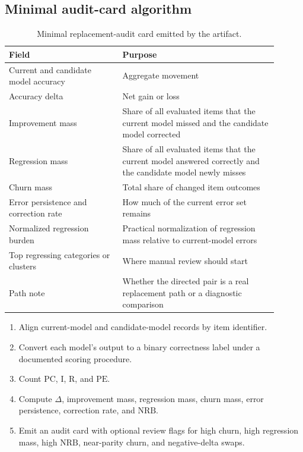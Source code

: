 \documentclass[manuscript, screen, review, nonacm]{jair}
\newcommand{\pc}{\mathrm{PC}}
\newcommand{\pe}{\mathrm{PE}}
\newcommand{\imp}{\mathrm{I}}
\newcommand{\reg}{\mathrm{R}}
\newcommand{\nrb}{\mathrm{NRB}}
\begin{document}
\subsection{Minimal audit-card algorithm}

\begin{table}[t]
\centering
\small
\begin{tabular}{p{0.38\linewidth}p{0.52\linewidth}}
\toprule
Field & Purpose \\
\midrule
Current and candidate model accuracy & Aggregate movement \\
Accuracy delta & Net gain or loss \\
Improvement mass & Share of all evaluated items that the current model missed and the candidate model corrected \\
Regression mass & Share of all evaluated items that the current model answered correctly and the candidate model newly misses \\
Churn mass & Total share of changed item outcomes \\
Error persistence and correction rate & How much of the current error set remains \\
Normalized regression burden & Practical normalization of regression mass relative to current-model errors \\
Top regressing categories or clusters & Where manual review should start \\
Path note & Whether the directed pair is a real replacement path or a diagnostic comparison \\
\bottomrule
\end{tabular}
\caption{Minimal replacement-audit card emitted by the artifact.}
\label{tab:audit-card}
\end{table}

\begin{enumerate}
  \item Align current-model and candidate-model records by item identifier.
  \item Convert each model's output to a binary correctness label under a documented scoring procedure.
  \item Count $\pc$, $\imp$, $\reg$, and $\pe$.
  \item Compute $\Delta$, improvement mass, regression mass, churn mass, error persistence, correction rate, and $\nrb$.
  \item Emit an audit card with optional review flags for high churn, high regression mass, high $\nrb$, near-parity churn, and negative-delta swaps.
\end{enumerate}
\end{document}
